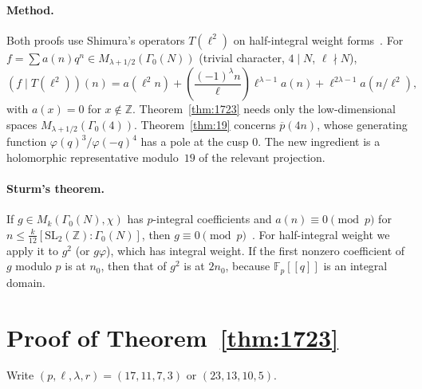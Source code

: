 \documentclass[11pt]{article}
\theoremstyle{remark}\newtheorem{remark}[theorem]{Remark}
\newcommand{\pb}{\overline{p}}
\newcommand{\leg}[2]{\left(\frac{#1}{#2}\right)}
\begin{document}
\paragraph{Method.} Both proofs use Shimura's operators $T(\ell^2)$ on half-integral weight forms~\cite{Shimura,Ono}. For $f=\sum a(n)q^n\in M_{\lambda+1/2}(\Gamma_0(N))$ (trivial character, $4\mid N$, $\ell\nmid N$),
\begin{equation}\label{eq:T}
(f\mid T(\ell^2))(n)=a(\ell^2n)+\leg{(-1)^\lambda n}{\ell}\ell^{\lambda-1}a(n)+\ell^{2\lambda-1}a(n/\ell^2),
\end{equation}
with $a(x)=0$ for $x\notin\mathbb Z$. Theorem~\ref{thm:1723} needs only the low-dimensional spaces $M_{\lambda+1/2}(\Gamma_0(4))$. Theorem~\ref{thm:19} concerns $\pb(4n)$, whose generating function $\varphi(q)^3/\varphi(-q)^4$ has a pole at the cusp $0$. The new ingredient is a holomorphic representative modulo~$19$ of the relevant projection.

\paragraph{Sturm's theorem.} If $g\in M_k(\Gamma_0(N),\chi)$ has $p$-integral coefficients and $a(n)\equiv0\pmod p$ for $n\le\frac{k}{12}[\mathrm{SL}_2(\mathbb Z):\Gamma_0(N)]$, then $g\equiv0\pmod p$~\cite{Sturm}. For half-integral weight we apply it to $g^2$ (or $g\varphi$), which has integral weight. If the first nonzero coefficient of $g$ modulo $p$ is at $n_0$, then that of $g^2$ is at $2n_0$, because $\mathbb F_p[[q]]$ is an integral domain.

\section{Proof of Theorem~\ref{thm:1723}}
Write $(p,\ell,\lambda,r)=(17,11,7,3)$ or $(23,13,10,5)$.
\end{document}
